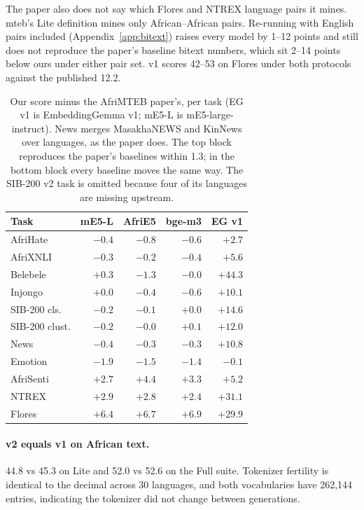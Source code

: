\documentclass[11pt]{article}
\newcommand{\eg}{EmbeddingGemma}
\begin{document}
The paper also does not say which Flores and NTREX language pairs it mines.
mteb's Lite definition mines only African--African pairs. Re-running with
English pairs included (Appendix~\ref{app:bitext}) raises every model by 1--12 points and still does not reproduce the paper's baseline bitext numbers, which
sit 2--14 points below ours under either pair set. v1 scores 42--53 on Flores
under both protocols against the published 12.2.

\begin{table}[t]
  \centering
  \small
  \setlength{\tabcolsep}{4pt}
  \begin{tabular}{lrrrr}
    \toprule
    Task & mE5-L & AfriE5 & bge-m3 & EG v1 \\
    \midrule
    AfriHate       & $-0.4$ & $-0.8$ & $-0.6$ & $+2.7$ \\
    AfriXNLI       & $-0.3$ & $-0.2$ & $-0.4$ & $+5.6$ \\
    Belebele       & $+0.3$ & $-1.3$ & $-0.0$ & $\mathbf{+44.3}$ \\
    Injongo        & $+0.0$ & $-0.4$ & $-0.6$ & $+10.1$ \\
    SIB-200 cls.   & $-0.2$ & $-0.1$ & $+0.0$ & $+14.6$ \\
    SIB-200 clust. & $-0.2$ & $-0.0$ & $+0.1$ & $+12.0$ \\
    News           & $-0.4$ & $-0.3$ & $-0.3$ & $+10.8$ \\
    \midrule
    Emotion        & $-1.9$ & $-1.5$ & $-1.4$ & $-0.1$ \\
    AfriSenti      & $+2.7$ & $+4.4$ & $+3.3$ & $+5.2$ \\
    NTREX          & $+2.9$ & $+2.8$ & $+2.4$ & $\mathbf{+31.1}$ \\
    Flores         & $+6.4$ & $+6.7$ & $+6.9$ & $\mathbf{+29.9}$ \\
    \bottomrule
  \end{tabular}
  \caption{Our score minus the AfriMTEB paper's, per task (EG v1 is
  \eg{} v1; mE5-L is mE5-large-instruct). News merges MasakhaNEWS and KinNews over
  languages, as the paper does. The top block reproduces the paper's
  baselines within 1.3; in the bottom block every baseline moves the same way. The SIB-200 v2 task is omitted because four of its
  languages are missing upstream.}
  \label{tab:reconcile}
\end{table}

\paragraph{v2 equals v1 on African text.}
44.8 vs 45.3 on Lite and 52.0 vs 52.6 on the Full suite. Tokenizer fertility
is identical to the decimal across 30 languages, and both vocabularies have 262,144 entries, indicating the tokenizer did not change between generations.
\end{document}

